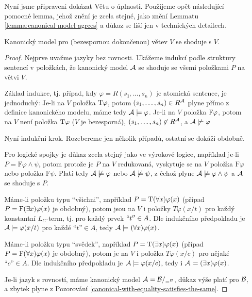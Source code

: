 Nyní jsme připraveni dokázat Větu o úplnosti. Použijeme opět následující pomocné lemma, jehož znění je zcela stejné, jako znění Lemmatu \ref{lemma:canonical-model-agrees} a důkaz se liší jen v technických detailech.

\begin{lemma}\label{lemma:canonical-model-agrees-predicate}
    Kanonický model pro (bezespornou dokončenou) větev $V$ se shoduje s $V$.
\end{lemma}
\begin{proof}
Nejprve uvažme jazyky bez rovnosti. Ukážeme indukcí podle struktury sentencí v položkách, že kanonický model $\mathcal{A}$ se shoduje se všemi položkami $P$ na větvi $V$. 

Základ indukce, tj. případ, kdy $\varphi=R(s_1,\dots,s_n)$ je atomická sentence, je jednoduchý: Je-li na $V$ položka $\mathrm{T}\varphi$, potom $(s_1,\dots,s_n)\in R^{\mathcal{A}}$ plyne přímo z definice kanonického modelu, máme tedy $\mathcal{A}\models\varphi$.  Je-li na $V$ položka $\mathrm{F}\varphi$, potom na $V$ není položka $\mathrm{T}\varphi$ ($V$ je bezesporná), $(s_1,\dots,s_n)\not\in R^{\mathcal{A}}$, a $\mathcal{A}\not\models\varphi$

Nyní indukční krok. Rozebereme jen několik případů, ostatní se dokáží obdobně. 

Pro logické spojky je důkaz zcela stejný jako ve výrokové logice, například je-li $P=\mathrm{F}\varphi\land\psi$, potom protože je $P$ na $V$ redukovaná, vyskytuje se na $V$ položka $\mathrm{F}\varphi$ nebo položka $\mathrm{F}\psi$. Platí tedy $\mathcal{A}\not\models\varphi$ nebo $\mathcal{A}\not\models\psi$, z čehož plyne $\mathcal{A}\not\models\varphi\land\psi$ a $\mathcal{A}$ se shoduje s $P$.

Máme-li položku typu ``všichni'', například $P=\mathrm{T}(\forall x)\varphi(x)$ 
(případ $P=\mathrm{F}(\exists x)\varphi(x)$ je obdobný), potom jsou na $V$ i položky $T\varphi(x/t)$ pro každý konstantní $L_C$-term, tj. pro každý prvek $``t''\in A$. Dle indukčního předpokladu je $\mathcal{A}\models\varphi(x/t)$ pro každé $\text{``$t$''}\in A$, tedy $\mathcal{A}\models(\forall x)\varphi(x)$.

Máme-li položku typu ``svědek'', například $P=\mathrm{T}(\exists x)\varphi(x)$ 
(případ $P=\mathrm{F}(\forall x)\varphi(x)$ je obdobný), potom je na $V$ i položka $T\varphi(x/c)$ pro nějaké $\text{``$c$''}\in A$. Dle indukčního předpokladu je $\mathcal{A}\models\varphi(x/c)$, tedy i $\mathcal{A}\models(\exists x)\varphi(x)$.

Je-li jazyk s rovností, máme kanonický model $\mathcal{A}=\mathcal{B}/_{=^B}$, důkaz výše platí pro $\mathcal{B}$, a zbytek plyne z Pozorování \ref{canonical-with-equality-satisfies-the-same}.
\end{proof}

